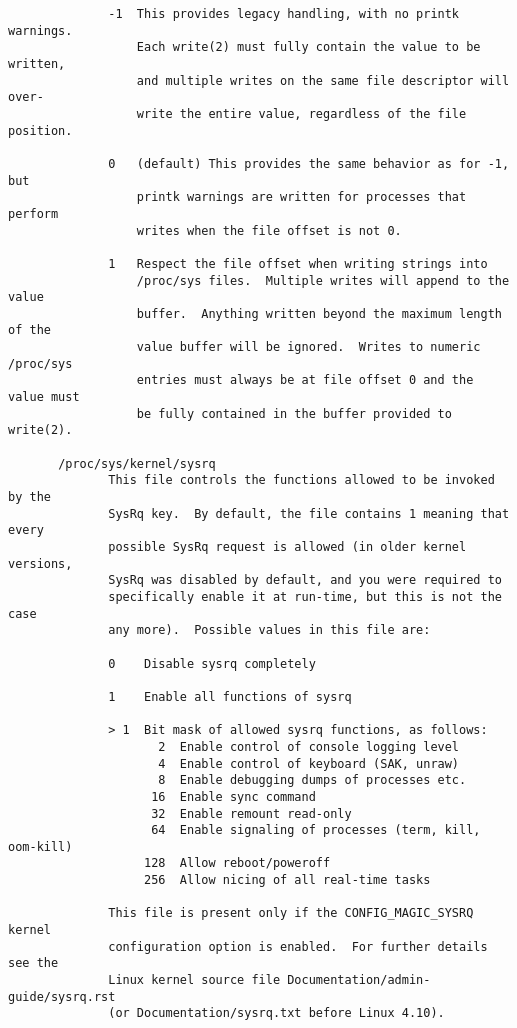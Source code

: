 \documentclass[]{article}
\begin{document}
\begin{verbatim}
              -1  This provides legacy handling, with no printk warnings.
                  Each write(2) must fully contain the value to be written,
                  and multiple writes on the same file descriptor will over‐
                  write the entire value, regardless of the file position.

              0   (default) This provides the same behavior as for -1, but
                  printk warnings are written for processes that perform
                  writes when the file offset is not 0.

              1   Respect the file offset when writing strings into
                  /proc/sys files.  Multiple writes will append to the value
                  buffer.  Anything written beyond the maximum length of the
                  value buffer will be ignored.  Writes to numeric /proc/sys
                  entries must always be at file offset 0 and the value must
                  be fully contained in the buffer provided to write(2).

       /proc/sys/kernel/sysrq
              This file controls the functions allowed to be invoked by the
              SysRq key.  By default, the file contains 1 meaning that every
              possible SysRq request is allowed (in older kernel versions,
              SysRq was disabled by default, and you were required to
              specifically enable it at run-time, but this is not the case
              any more).  Possible values in this file are:

              0    Disable sysrq completely

              1    Enable all functions of sysrq

              > 1  Bit mask of allowed sysrq functions, as follows:
                     2  Enable control of console logging level
                     4  Enable control of keyboard (SAK, unraw)
                     8  Enable debugging dumps of processes etc.
                    16  Enable sync command
                    32  Enable remount read-only
                    64  Enable signaling of processes (term, kill, oom-kill)
                   128  Allow reboot/poweroff
                   256  Allow nicing of all real-time tasks

              This file is present only if the CONFIG_MAGIC_SYSRQ kernel
              configuration option is enabled.  For further details see the
              Linux kernel source file Documentation/admin-guide/sysrq.rst
              (or Documentation/sysrq.txt before Linux 4.10).


\end{verbatim}
\end{document}
